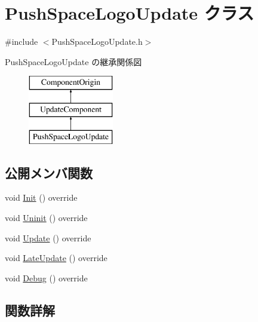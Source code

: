 \hypertarget{class_push_space_logo_update}{}\section{Push\+Space\+Logo\+Update クラス}
\label{class_push_space_logo_update}


{\ttfamily \#include $<$Push\+Space\+Logo\+Update.\+h$>$}

Push\+Space\+Logo\+Update の継承関係図\begin{figure}[H]
\begin{center}
\leavevmode
\includegraphics[height=3.000000cm]{class_push_space_logo_update}
\end{center}
\end{figure}
\subsection*{公開メンバ関数}
\begin{DoxyCompactItemize}
\item 
void \mbox{\hyperlink{class_push_space_logo_update_a9c165604160c012b429c1db1d67ffb2a}{Init}} () override
\item 
void \mbox{\hyperlink{class_push_space_logo_update_a94f791874cb6160cd33cd7068fcde0d0}{Uninit}} () override
\item 
void \mbox{\hyperlink{class_push_space_logo_update_aa07fe6f6f4f072e1f81bc6708dd4727e}{Update}} () override
\item 
void \mbox{\hyperlink{class_push_space_logo_update_a4423864fb22b1211e92a4317d0b70a44}{Late\+Update}} () override
\item 
void \mbox{\hyperlink{class_push_space_logo_update_ac61b14b1364b606771fc1080da041877}{Debug}} () override
\end{DoxyCompactItemize}


\subsection{関数詳解}
\mbox{\label{class_push_space_logo_update_ac61b14b1364b606771fc1080da041877}} 
